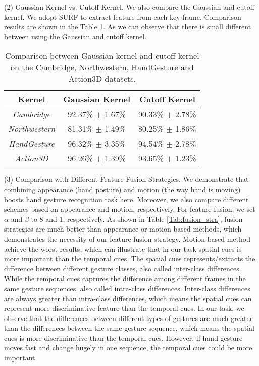 \documentclass[5p]{elsarticle}
\begin{document}
\noindent (2) Gaussian Kernel vs. Cutoff Kernel.
We also compare the Gaussian and cutoff kernel.
We adopt  SURF to extract feature from each key frame.
Comparison results are shown in the Table \ref{Tab:kernel}.
As we can observe that there is small different between using the Gaussian and cutoff kernel.

\begin{table}[!htbp]
	\centering
	\caption{Comparison between Gaussian kernel and cutoff kernel on the Cambridge, Northwestern, HandGesture and Action3D datasets.}
	\begin{tabular}{c|c|c} \hline
		Kernel                          & Gaussian Kernel          & Cutoff Kernel\\ \hline
		\emph{Cambridge}       & 92.37\% $\pm$ 1.67\% & 90.33\% $\pm$ 2.78\%   \\ \hline
		\emph{Northwestern}  & 81.31\% $\pm$ 1.49\%  & 80.25\% $\pm$ 1.86\%   \\ \hline
		\emph{HandGesture}   & 96.32\% $\pm$ 3.35\% & 94.54\% $\pm$ 2.78\%    \\ \hline
		\emph{Action3D}         & 96.26\% $\pm$ 1.39\% & 93.65\% $\pm$ 1.23\%   \\ \hline
	\end{tabular}
	\label{Tab:kernel}
\end{table}

\noindent (3) Comparison with Different Feature Fusion Strategies.
We demonstrate that combining appearance (hand posture) and motion (the way hand is moving) boosts hand gesture recognition task here.
Moreover, we also compare different schemes based on appearance and motion, respectively.
For feature fusion, we set $\alpha$ and $\beta$ to 8 and 1, respectively.
As shown in Table \ref{Tab:fusion_stra}, fusion strategies are much better than appearance or motion based methods, which demonstrates the necessity of our feature fusion strategy.
Motion-based method achieve the worst results, which can illustrate that in our task spatial cues is more important than the temporal cues.
The spatial cues represents/extracts the difference between different gesture classes, also called inter-class differences.
While the temporal cues captures the difference among different frames in the same gesture sequences, also called intra-class differences.
Inter-class differences are always greater than intra-class differences, which means the spatial cues can represent more discriminative feature than the temporal cues.
In our task, we observe that the differences between different types of gestures are much greater than the differences between the same gesture sequence, which means the spatial cues is more discriminative than the temporal cues.
However, if hand gesture moves fast and change hugely in one sequence, the temporal cues could be more important.
\end{document}
